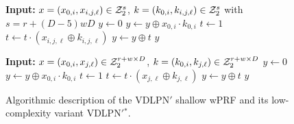 \begin{figure}[ht]
\centering
\begin{minipage}[t]{0.47\textwidth}
\begin{algorithm}[H]
  \caption{\label{alg:vdlpn_variant}The {\sf VDLPN}$'$ wPRF\\Parameters: Integers $r, w, D$}
  \begin{algorithmic}
   \State \textbf{Input:} $x = (x_{0,i}, x_{i,j,\ell}) \in \mathcal{Z}_2^{s}$, $k = (k_{0,i},k_{i,j,\ell}) \in \mathcal{Z}_2^{s}$ with $s=r+(D-5) w D$
    \State $y \gets 0$
      \State $y \gets y \oplus x_{0,i}\cdot k_{0,i}$
    \EndFor
        \State $t \gets 1$
          \State $t \gets t \cdot (x_{i,j,\ell} \oplus k_{i,j,\ell})$
        \EndFor
        \State $y \gets y \oplus t$
      \EndFor
    \EndFor
    \State \Return $y$
  \end{algorithmic}
\end{algorithm}
\end{minipage}
\hfill
\begin{minipage}[t]{0.47\textwidth}
\begin{algorithm}[H]
  \caption{\label{alg:vdlpn_simple_variant}The {{\sf VDLPN}$'$}$^*$ wPRF\\Parameters: Integers $r,w, D$}
  \begin{algorithmic}
    \State \textbf{Input:} $x = (x_{0,i}, x_{j,\ell}) \in \mathcal{Z}_2^{r+w\times D}$,  $k = (k_{0,i}, k_{j,\ell}) \in \mathcal{Z}_2^{r+w\times D}$
    \State $y \gets 0$
      \State $y \gets y \oplus x_{0,i}\cdot k_{0,i}$
    \EndFor
        \State $t \gets 1$
          \State $t \gets t \cdot (x_{j,\ell} \oplus k_{j,\ell})$
        \EndFor
        \State $y \gets y \oplus t$
      \EndFor
    \EndFor
    \State \Return $y$
  \end{algorithmic}
\end{algorithm}
\end{minipage}
\caption{Algorithmic description of the {\sf VDLPN}$'$ shallow wPRF and its low-complexity variant {{\sf VDLPN}$'$}$^*$.}
\end{figure}












